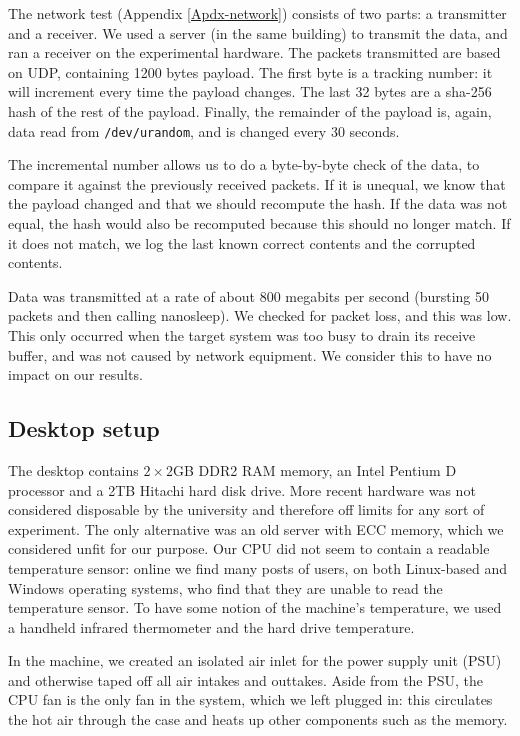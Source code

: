 \documentclass[conference]{IEEEtran}
\begin{document}
The network test (Appendix \ref{Apdx-network}) consists of two parts: a
transmitter and a receiver. We used a server (in the same building) to transmit
the data, and ran a receiver on the experimental hardware. The packets
transmitted are based on UDP, containing 1200 bytes payload. The first byte is
a tracking number: it will increment every time the payload changes. The last
32 bytes are a sha-256 hash of the rest of the payload. Finally, the remainder
of the payload is, again, data read from \texttt{/dev/urandom}, and is changed
every 30 seconds.

The incremental number allows us to do a byte-by-byte check of the data, to
compare it against the previously received packets. If it is unequal, we know
that the payload changed and that we should recompute the hash. If the data was
not equal, the hash would also be recomputed because this should no longer
match. If it does not match, we log the last known correct contents and the
corrupted contents.

Data was transmitted at a rate of about 800 megabits per second (bursting 50
packets and then calling nanosleep). We checked for packet loss, and this was
low. This only occurred when the target system was too busy to drain its
receive buffer, and was not caused by network equipment. We consider this to
have no impact on our results.

\subsection{Desktop setup}\label{desktop-setup}

The desktop contains $2\times2$GB DDR2 RAM memory, an Intel Pentium D processor
and a 2TB Hitachi hard disk drive. More recent hardware was not considered
disposable by the university and therefore off limits for any sort of
experiment. The only alternative was an old server with ECC memory, which we
considered unfit for our purpose. Our CPU did not seem to contain a readable
temperature sensor: online we find many posts of users, on both Linux-based and
Windows operating systems, who find that they are unable to read the
temperature sensor. To have some notion of the machine's temperature, we used a
handheld infrared thermometer and the hard drive temperature.

In the machine, we created an isolated air inlet for the power supply unit
(PSU) and otherwise taped off all air intakes and outtakes. Aside from the PSU,
the CPU fan is the only fan in the system, which we left plugged in: this
circulates the hot air through the case and heats up other components such as
the memory.
\end{document}
